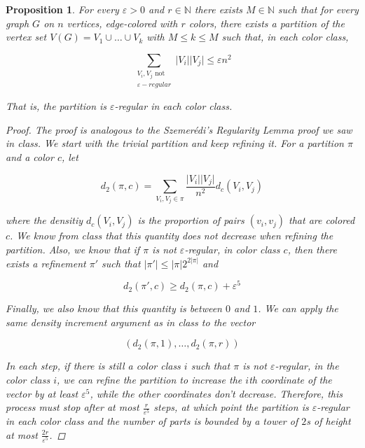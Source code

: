 \documentclass{amsart}
\theoremstyle{plain}
\newtheorem*{proposition}{\textbf{Proposition}}
\theoremstyle{definition}
\newcommand{\N}{\mathbb{N}}
\begin{document}
    \begin{proposition}
        For every $\varepsilon > 0$ and $r \in \N$ there exists $M \in \N$ such that
        for every graph $G$ on $n$ vertices, edge-colored with $r$ colors, there exists a partition of the vertex set
        $V(G) = V_1 \cup \ldots \cup V_k$ with $M \leq k \leq M$ such that, in each color class,

        \[
             \sum_{\substack{V_i, V_j \text{ not } \\ \varepsilon-regular}} \lvert V_i \rvert \lvert V_j \rvert \leq \varepsilon n^2
        \]

        That is, the partition is $\varepsilon$-regular in each color class.

        \begin{proof}
            The proof is analogous to the Szemerédi's Regularity Lemma proof we saw in class.
            We start with the trivial partition and keep refining it.
            For a partition $\pi$ and a color $c$, let

            \[
                d_2(\pi, c) = \sum_{V_i, V_j \in \pi} \frac{\lvert V_i \rvert \lvert V_j \rvert}{n^2} d_c(V_i, V_j)
            \]

            where the densitiy $d_c(V_i, V_j)$ is the proportion of pairs $(v_i, v_j)$ that are colored $c$.
            We know from class that this quantity does not decrease when refining the partition.
            Also, we know that if $\pi$ is not $\varepsilon$-regular, in color class $c$, then there exists
            a refinement $\pi'$ such that $\lvert \pi' \rvert \leq \lvert \pi \rvert 2^{2 \lvert \pi \rvert}$ and

            \[
                d_2(\pi', c) \geq d_2(\pi, c) + \varepsilon^5
            \]

            Finally, we also know that this quantity is between $0$ and $1$.
            We can apply the same density increment argument as in class to the vector

            \[
                \left( d_2(\pi, 1), \ldots, d_2(\pi, r) \right)
            \]

            In each step, if there is still a color class $i$ such that $\pi$ is not $\varepsilon$-regular,
            in the color class $i$, we can refine the partition to increase the $i$th coordinate of the vector
            by at least $\varepsilon^5$, while the other coordinates don't decrease.
            Therefore, this process
            must stop after at most $\frac{r}{\varepsilon^5}$ steps,
            at which point the partition is $\varepsilon$-regular in each color class
            and the number of parts is bounded by a tower of $2$s of height at most $\frac{2r}{\varepsilon^5}$. \qedhere

        \end{proof}
    \end{proposition}
\end{document}
